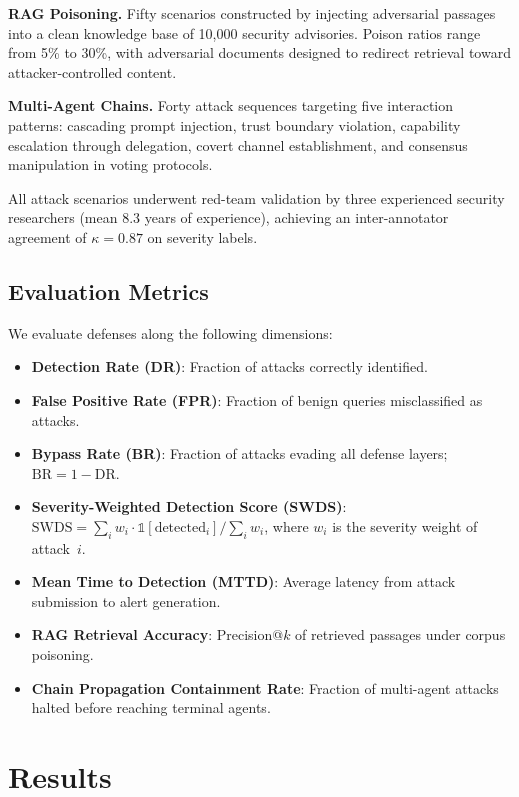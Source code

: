 \documentclass[journal,twoside]{IEEEtran}
\begin{document}
\textbf{RAG Poisoning.} Fifty scenarios constructed by injecting adversarial passages into a clean knowledge base of 10{,}000 security advisories. Poison ratios range from 5\% to 30\%, with adversarial documents designed to redirect retrieval toward attacker-controlled content.

\textbf{Multi-Agent Chains.} Forty attack sequences targeting five interaction patterns: cascading prompt injection, trust boundary violation, capability escalation through delegation, covert channel establishment, and consensus manipulation in voting protocols.

All attack scenarios underwent red-team validation by three experienced security researchers (mean 8.3 years of experience), achieving an inter-annotator agreement of $\kappa = 0.87$ on severity labels.

\subsection{Evaluation Metrics}

We evaluate defenses along the following dimensions:
\begin{itemize}
    \item \textbf{Detection Rate (DR)}: Fraction of attacks correctly identified.
    \item \textbf{False Positive Rate (FPR)}: Fraction of benign queries misclassified as attacks.
    \item \textbf{Bypass Rate (BR)}: Fraction of attacks evading all defense layers; $\text{BR} = 1 - \text{DR}$.
    \item \textbf{Severity-Weighted Detection Score (SWDS)}: $\text{SWDS} = \sum_{i} w_i \cdot \mathbb{1}[\text{detected}_i] / \sum_i w_i$, where $w_i$ is the severity weight of attack~$i$.
    \item \textbf{Mean Time to Detection (MTTD)}: Average latency from attack submission to alert generation.
    \item \textbf{RAG Retrieval Accuracy}: Precision@$k$ of retrieved passages under corpus poisoning.
    \item \textbf{Chain Propagation Containment Rate}: Fraction of multi-agent attacks halted before reaching terminal agents.
\end{itemize}

\section{Results}\label{sec:results}
\end{document}
